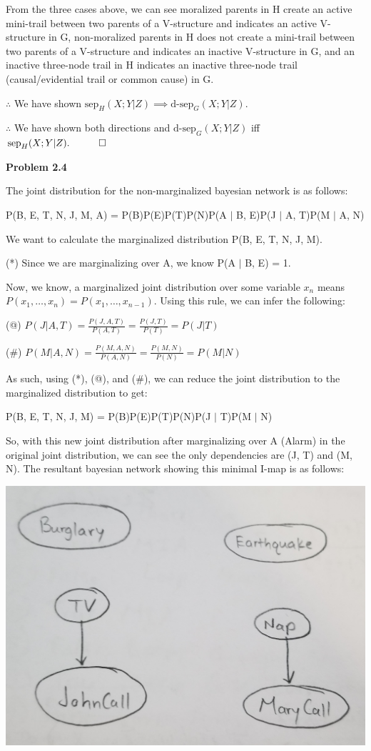 \documentclass[12pt]{article}
\begin{document}
From the three cases above, we can see moralized parents in H create an active mini-trail between two parents of a V-structure and indicates an active V-structure in G, non-moralized parents in H does not create a mini-trail between two parents of a V-structure and indicates an inactive V-structure in G, and an inactive three-node trail in H indicates an inactive three-node trail (causal/evidential trail or common cause) in G.

$\therefore$ We have shown $\text{sep}_H(X; Y \vert Z) \implies \text{d-sep}_G(X; Y \vert Z)$.

$\therefore$ We have shown both directions and $\text{d-sep}_G(X; Y \vert Z)$ iff $\text{sep}_H(X; Y \vert Z). \quad\qed$

\pagebreak\textbf{Problem 2.4}

The joint distribution for the non-marginalized bayesian network is as follows:

P(B, E, T, N, J, M, A) = P(B)P(E)P(T)P(N)P(A $\vert$ B, E)P(J $\vert$ A, T)P(M $\vert$ A, N)

We want to calculate the marginalized distribution P(B, E, T, N, J, M).

(*) Since we are marginalizing over A, we know P(A $\vert$ B, E) = 1.

Now, we know, a marginalized joint distribution over some variable $x_n$ means $P(x_1, \dots, x_n) = P(x_1, \dots, x_{n-1})$. Using this rule, we can infer the following:

(@) $P(J \vert A, T) = \frac{P(J, A, T)}{P(A, T)} = \frac{P(J, T)}{P(T)} = P(J \vert T)$

(\#) $P(M \vert A, N) = \frac{P(M, A, N)}{P(A, N)} = \frac{P(M, N)}{P(N)} = P(M \vert N)$

As such, using (*), (@), and (\#), we can reduce the joint distribution to the marginalized distribution to get:

P(B, E, T, N, J, M) = P(B)P(E)P(T)P(N)P(J $\vert$ T)P(M $\vert$ N)

So, with this new joint distribution after marginalizing over A (Alarm) in the original joint distribution, we can see the only dependencies are (J, T) and (M, N). The resultant bayesian network showing this minimal I-map is as follows:

\includegraphics[scale=0.2]{q2-sub3}
\end{document}
